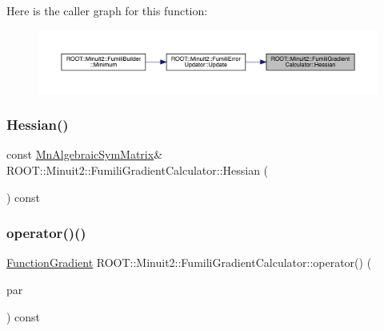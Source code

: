 Here is the caller graph for this function\+:\nopagebreak
\begin{figure}[H]
\begin{center}
\leavevmode
\includegraphics[width=350pt]{d8/de6/classROOT_1_1Minuit2_1_1FumiliGradientCalculator_aa6c751b836a8ce27b7335d7d3d6a653f_icgraph}
\end{center}
\end{figure}
\mbox{\label{classROOT_1_1Minuit2_1_1FumiliGradientCalculator_aa6c751b836a8ce27b7335d7d3d6a653f}} 
\subsubsection{\texorpdfstring{Hessian()}{Hessian()}\hspace{0.1cm}{\footnotesize\ttfamily [2/2]}}
{\footnotesize\ttfamily const \mbox{\hyperlink{namespaceROOT_1_1Minuit2_a9e74ad97f5537a2e80e52b04d98ecc6e}{Mn\+Algebraic\+Sym\+Matrix}}\& R\+O\+O\+T\+::\+Minuit2\+::\+Fumili\+Gradient\+Calculator\+::\+Hessian (\begin{DoxyParamCaption}{ }\end{DoxyParamCaption}) const\hspace{0.3cm}{\ttfamily [inline]}}

\mbox{\label{classROOT_1_1Minuit2_1_1FumiliGradientCalculator_a23fd61bceabbf88e66c5abe6b2815331}} 
\subsubsection{\texorpdfstring{operator()()}{operator()()}\hspace{0.1cm}{\footnotesize\ttfamily [1/4]}}
{\footnotesize\ttfamily \mbox{\hyperlink{classROOT_1_1Minuit2_1_1FunctionGradient}{Function\+Gradient}} R\+O\+O\+T\+::\+Minuit2\+::\+Fumili\+Gradient\+Calculator\+::operator() (\begin{DoxyParamCaption}\item[{const \mbox{\hyperlink{classROOT_1_1Minuit2_1_1MinimumParameters}{Minimum\+Parameters}} \&}]{par }\end{DoxyParamCaption}) const\hspace{0.3cm}{\ttfamily [virtual]}}



